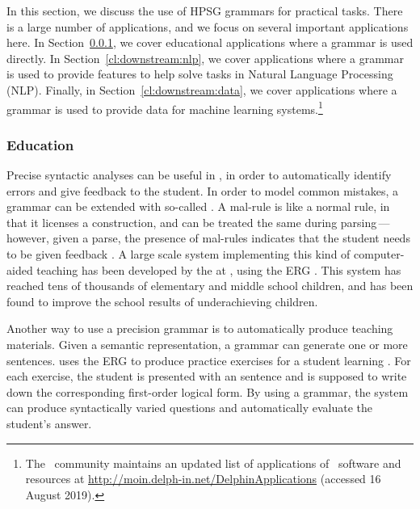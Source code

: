 \documentclass[output=paper,nonflat]{langsci/langscibook}
\begin{document}
In this section, we discuss
the use of HPSG grammars for practical tasks.
There is a large number of applications,
and we focus on several important applications here.
In Section~\ref{cl:downstream:edu},
we cover educational applications where a grammar is used directly.
In Section~\ref{cl:downstream:nlp},
we cover applications where a grammar is used to provide features
to help solve tasks in Natural Language Processing (NLP).
Finally, in Section~\ref{cl:downstream:data},
we cover applications where a grammar is used to provide data for machine learning systems.\footnote{The \delphin\ community maintains an updated list
of applications of \delphin\ software and resources at \url{http://moin.delph-in.net/DelphinApplications} (accessed 16 August 2019).}



\subsubsection{Education}
\label{cl:downstream:edu}


Precise syntactic analyses can be useful in ,
in order to automatically identify errors and give feedback to the student.
In order to model common mistakes,
a grammar can be extended with so-called \textit{}.
A mal-rule is like a normal rule, in that it licenses a construction,
and can be treated the same during parsing\,---\,however, given a parse,
the presence of mal-rules indicates that the student needs to be given feedback
\citep{Ben:Fli:Oep:04,flickinger2013error,morgadodacosta2016error}.
A large scale system implementing this kind of computer-aided teaching has been developed
by the  at ,
using the ERG \citep{suppes2014teach}.
This system has reached tens of thousands of elementary and middle school children,
and has been found to improve the school results of underachieving children.

Another way to use a precision grammar is to automatically produce teaching materials.
Given a semantic representation,
a grammar can generate one or more sentences.
\citet{Flickinger:17} uses the ERG to produce practice exercises for a student learning .
For each exercise, the student is presented with an  sentence
and is supposed to write down the corresponding first-order logical form.
By using a grammar, the system can produce syntactically varied questions
and automatically evaluate the student's answer.%
\end{document}
